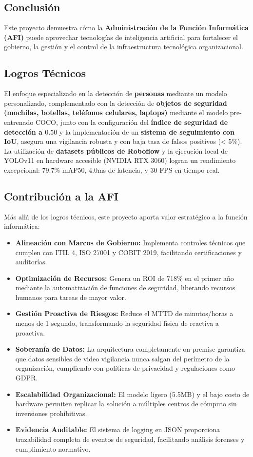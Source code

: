 \documentclass[12pt, a4paper]{article}
\begin{document}
\begin{itemize}
\section{Conclusión}

Este proyecto demuestra cómo la \textbf{Administración de la Función Informática (AFI)} puede aprovechar tecnologías de inteligencia artificial para fortalecer el gobierno, la gestión y el control de la infraestructura tecnológica organizacional. 

\subsection{Logros Técnicos}
El enfoque especializado en la detección de \textbf{personas} mediante un modelo personalizado, complementado con la detección de \textbf{objetos de seguridad (mochilas, botellas, teléfonos celulares, laptops)} mediante el modelo pre-entrenado COCO, junto con la configuración del \textbf{índice de seguridad de detección a $\mathbf{0.50}$} y la implementación de un \textbf{sistema de seguimiento con IoU}, asegura una vigilancia robusta y con baja tasa de falsos positivos (< 5\%). La utilización de \textbf{datasets públicos de Roboflow} y la ejecución local de YOLOv11 en hardware accesible (NVIDIA RTX 3060) logran un rendimiento excepcional: 79.7\% mAP50, 4.0ms de latencia, y 30 FPS en tiempo real.

\subsection{Contribución a la AFI}
Más allá de los logros técnicos, este proyecto aporta valor estratégico a la función informática:

\begin{itemize}
\item \textbf{Alineación con Marcos de Gobierno:} Implementa controles técnicos que cumplen con ITIL 4, ISO 27001 y COBIT 2019, facilitando certificaciones y auditorías.
\item \textbf{Optimización de Recursos:} Genera un ROI de 718\% en el primer año mediante la automatización de funciones de seguridad, liberando recursos humanos para tareas de mayor valor.
\item \textbf{Gestión Proactiva de Riesgos:} Reduce el MTTD de minutos/horas a menos de 1 segundo, transformando la seguridad física de reactiva a proactiva.
\item \textbf{Soberanía de Datos:} La arquitectura completamente on-premise garantiza que datos sensibles de video vigilancia nunca salgan del perímetro de la organización, cumpliendo con políticas de privacidad y regulaciones como GDPR.
\item \textbf{Escalabilidad Organizacional:} El modelo ligero (5.5MB) y el bajo costo de hardware permiten replicar la solución a múltiples centros de cómputo sin inversiones prohibitivas.
\item \textbf{Evidencia Auditable:} El sistema de logging en JSON proporciona trazabilidad completa de eventos de seguridad, facilitando análisis forenses y cumplimiento normativo.
\end{itemize}


\end{itemize}
\end{document}
